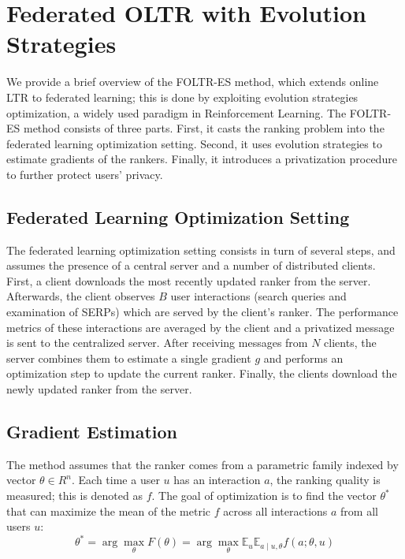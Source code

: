 
\section{Federated OLTR with Evolution Strategies}\label{sec:method}

We provide a brief overview of the FOLTR-ES method, which extends online LTR to federated learning; this is done by exploiting evolution strategies optimization, a widely used paradigm in Reinforcement Learning. 
The FOLTR-ES method consists of three parts. First, it casts the ranking problem into the federated learning optimization setting. Second, it uses evolution strategies to estimate gradients of the rankers. Finally, it introduces a privatization procedure to further protect users' privacy.

\subsection{Federated Learning Optimization Setting}
The federated learning optimization setting consists in turn of several steps, and assumes the presence of a central server and a number of distributed clients. First, a client downloads the most recently updated ranker from the server. Afterwards, the client observes $B$ user interactions (search queries and examination of SERPs) which are served by the client's ranker. The performance metrics of these interactions are averaged by the client and a privatized message is sent to the centralized server. After receiving messages from $N$ clients, the server combines them to estimate a single gradient $g$ and performs an optimization step to update the current ranker. Finally, the clients download the newly updated ranker from the server.

\subsection{Gradient Estimation} \label{sec-gradient-est}
The method assumes that the ranker comes from a parametric family indexed by vector $\theta \in R^{n}$. Each time a user $u$ has an interaction $a$, the ranking quality is measured; this is denoted as $f$. The goal of optimization is to find the vector $\theta^*$ that can maximize the mean of the metric $f$ across all interactions $a$ from all users $u$:
\begin{equation}
	\theta^{*}=\arg \max _{\theta} F(\theta)=\arg \max _{\theta} \mathbb{E}_{u} \mathbb{E}_{a \mid u, \theta} f(a ; \theta, u) \label{eq-theta}
\end{equation}


